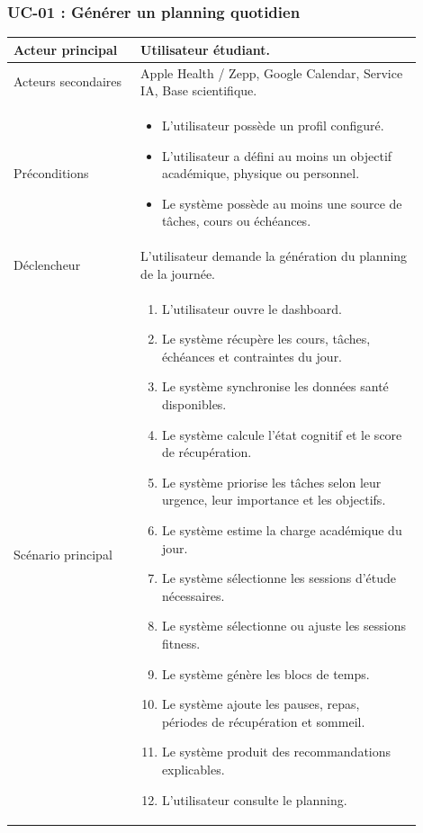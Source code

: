 \documentclass[12pt]{article}
\begin{document}
\subsubsection{UC-01 : Générer un planning quotidien}
\begin{longtable}{|p{0.28\linewidth}|p{0.62\linewidth}|}

\hline
Acteur principal & Utilisateur étudiant. \\ \hline

Acteurs secondaires & Apple Health / Zepp, Google Calendar, Service IA, Base scientifique. \\ \hline

Préconditions &
\begin{itemize}[leftmargin=*]
    \item L'utilisateur possède un profil configuré.
    \item L'utilisateur a défini au moins un objectif académique, physique ou personnel.
    \item Le système possède au moins une source de tâches, cours ou échéances.
\end{itemize}
\\ \hline

Déclencheur & L'utilisateur demande la génération du planning de la journée. \\ \hline

Scénario principal &
\begin{enumerate}[leftmargin=*]
    \item L'utilisateur ouvre le dashboard.
    \item Le système récupère les cours, tâches, échéances et contraintes du jour.
    \item Le système synchronise les données santé disponibles.
    \item Le système calcule l'état cognitif et le score de récupération.
    \item Le système priorise les tâches selon leur urgence, leur importance et les objectifs.
    \item Le système estime la charge académique du jour.
    \item Le système sélectionne les sessions d'étude nécessaires.
    \item Le système sélectionne ou ajuste les sessions fitness.
    \item Le système génère les blocs de temps.
    \item Le système ajoute les pauses, repas, périodes de récupération et sommeil.
    \item Le système produit des recommandations explicables.
    \item L'utilisateur consulte le planning.
\end{enumerate}
\\ \hline


\end{longtable}
\end{document}
